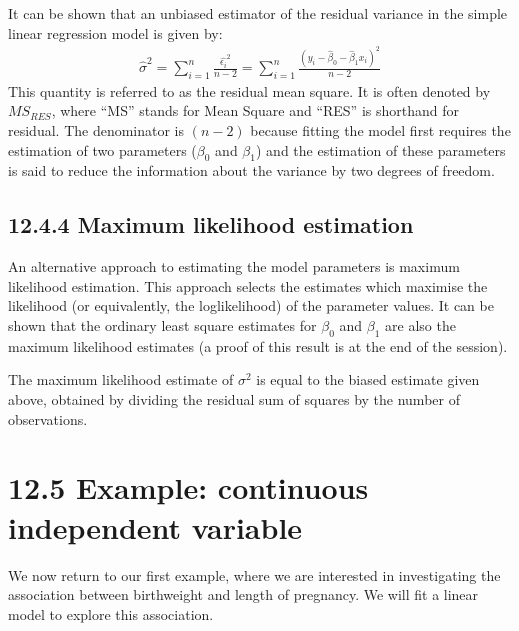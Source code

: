 \documentclass[letterpaper,10pt,english]{jupyterBook}
\begin{document}
\sphinxAtStartPar
It can be shown that an unbiased estimator of the residual variance in the simple linear regression model is given by:
\begin{equation*}
\begin{split}
\hat{\sigma}^2  = \sum_{i=1}^n \frac{\hat{\epsilon_i}^2}{n-2}=\sum_{i=1}^n \frac{(y_i-\hat{\beta}_0-\hat{\beta}_1 x_i)^2}{n-2}
\end{split}
\end{equation*}
\sphinxAtStartPar
This quantity is referred to as the residual mean square. It is often denoted by \(MS_{RES}\), where “MS” stands for Mean Square and “RES” is shorthand for residual. The denominator is \((n-2)\) because fitting the model first requires the estimation of two parameters (\(\beta_0\) and \(\beta_1\)) and the estimation of these parameters is said to reduce the information about the variance by two degrees of freedom.


\subsection{12.4.4 Maximum likelihood estimation}
\label{\detokenize{12.e. Linear Regression I:maximum-likelihood-estimation}}
\sphinxAtStartPar
An alternative approach to estimating the model parameters is maximum likelihood estimation. This approach selects the estimates which maximise the likelihood (or equivalently, the log\sphinxhyphen{}likelihood) of the parameter values. It can be shown that the ordinary least square estimates for \(\beta_0\) and \(\beta_1\) are also the maximum likelihood estimates (a proof of this result is at the end of the session).

\sphinxAtStartPar
The maximum likelihood estimate of \(\sigma^2\) is equal to the biased estimate given above, obtained by dividing the residual sum of squares by the number of observations.


\section{12.5 Example: continuous independent variable}
\label{\detokenize{12.f. Linear Regression I:example-continuous-independent-variable}}\label{\detokenize{12.f. Linear Regression I::doc}}
\sphinxAtStartPar
We now return to our first example, where we are interested in investigating the association between birthweight and length of pregnancy. We will fit a linear model to explore this association.
\end{document}
